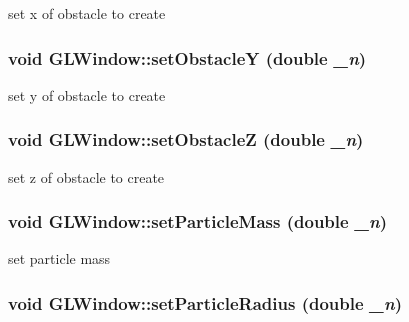 set x of obstacle to create \hypertarget{classGLWindow_a9e54638fd294268ac1de1bb975fd273d}{
\subsubsection[{setObstacleY}]{\setlength{\rightskip}{0pt plus 5cm}void GLWindow::setObstacleY (double {\em \_\-n})}}
\label{classGLWindow_a9e54638fd294268ac1de1bb975fd273d}


set y of obstacle to create \hypertarget{classGLWindow_a6e1ada1afcabc2dc69ba0df2dad81652}{
\subsubsection[{setObstacleZ}]{\setlength{\rightskip}{0pt plus 5cm}void GLWindow::setObstacleZ (double {\em \_\-n})}}
\label{classGLWindow_a6e1ada1afcabc2dc69ba0df2dad81652}


set z of obstacle to create \hypertarget{classGLWindow_ac7b9cdef1ba718032b06f8043f4836d3}{
\subsubsection[{setParticleMass}]{\setlength{\rightskip}{0pt plus 5cm}void GLWindow::setParticleMass (double {\em \_\-n})}}
\label{classGLWindow_ac7b9cdef1ba718032b06f8043f4836d3}


set particle mass \hypertarget{classGLWindow_aeba4b7318975e80b3ed1efb971a91bbb}{
\subsubsection[{setParticleRadius}]{\setlength{\rightskip}{0pt plus 5cm}void GLWindow::setParticleRadius (double {\em \_\-n})}}
\label{classGLWindow_aeba4b7318975e80b3ed1efb971a91bbb}


